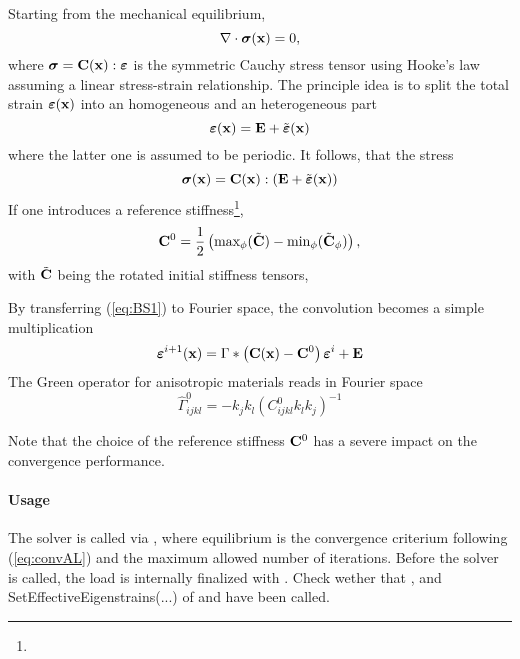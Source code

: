 Starting from the mechanical equilibrium,
\begin{equation}
	\nabla \cdot \sigmaB(\xB) = 0,
  \label{eq:BSeq}
\end{equation}
where $\mbox{\boldmath $\sigma$} = \mathbf{C}(\mathbf{x}):\mbox{\boldmath $\varepsilon$}$ is the symmetric Cauchy stress tensor using Hooke's law assuming a linear stress-strain relationship.
The principle idea is to split the total strain $\mbox{\boldmath $\varepsilon$}(\mathbf{x})$ into an homogeneous and an heterogeneous part
\begin{equation}
  \varepsilonB(\xB) = \EB + \tilde{\varepsilonB}(\xB)
  \label{eq:BS1}
\end{equation}
where the latter one is assumed to be periodic. It follows, that the stress 
\begin{equation}
  \sigmaB(\xB) = \CB(\xB) : (\EB + \tilde{\varepsilonB}(\xB)) 
  \label{eq:BS2}
\end{equation}
If one introduces a reference stiffness\footnote{}, 
\begin{equation}
\CB^0 = \frac{1}{2}\left(\textrm{max}_{\phi}(\tilde{\CB}) - \textrm{min}_{\phi}(\tilde{\CB}_\phi)\right),
\label{eq:BS3}
\end{equation}
with $\tilde{\mathbf{C}}$ being the rotated initial stiffness tensors,


By transferring (\ref{eq:BS1}) to Fourier space, the convolution becomes a simple multiplication
\begin{equation}
  \varepsilonB^{i+1}(\xB) = \Gamma \ast \left(\CB(\xB) - \CB^0\right)\varepsilonB^i + \EB
  \label{eq:BS3}
\end{equation}
The Green operator for anisotropic materials reads in Fourier space
\begin{equation}
  \hat{\Gamma}^0_{ijkl} = -k_j k_l \left(C^0_{ijkl} k_l k_j \right)^{-1} 
\end{equation}

Note that the choice of the reference stiffness $\mathbf{C}^0$ has a severe impact on the convergence performance. 


\paragraph{Usage} The solver is called via , where \textsf{equilibrium} is the convergence criterium following (\ref{eq:convAL}) and  the maximum allowed number of iterations. Before the solver is called, the load is internally finalized with . Check wether that ,  and \textsf{ SetEffectiveEigenstrains(...)} of  and  have been called.
            
